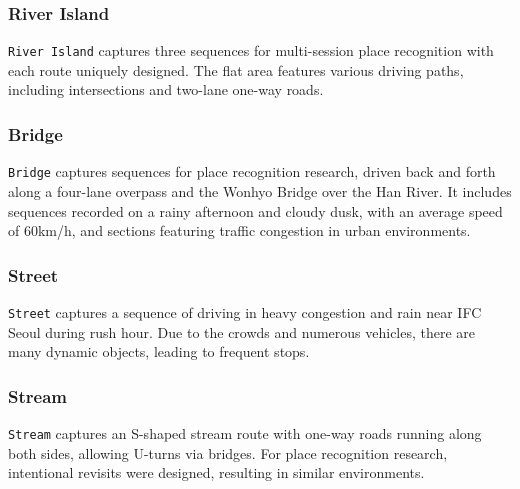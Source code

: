 \subsubsection{River Island}
\texttt{River Island} captures three sequences for multi-session place recognition with each route uniquely designed. The flat area features various driving paths, including intersections and two-lane one-way roads.
\subsubsection{Bridge}
\texttt{Bridge} captures sequences for place recognition research, driven back and forth along a four-lane overpass and the Wonhyo Bridge over the Han River. It includes sequences recorded on a rainy afternoon and cloudy dusk, with an average speed of \unit{60}{km/h}, and sections featuring traffic congestion in urban environments.
\subsubsection{Street}
\texttt{Street} captures a sequence of driving in heavy congestion and rain near IFC Seoul during rush hour. Due to the crowds and numerous vehicles, there are many dynamic objects, leading to frequent stops.
\subsubsection{Stream}
\texttt{Stream} captures an S-shaped stream route with one-way roads running along both sides, allowing U-turns via bridges. For place recognition research, intentional revisits were designed, resulting in similar environments.




